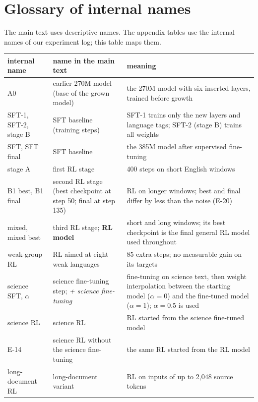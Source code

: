 
\FloatBarrier

\section{Glossary of internal names}\label{app:glossary}
The main text uses descriptive names. The appendix tables use the internal names of our experiment log; this table maps them.
\begin{table}[h]
\centering\footnotesize
\begin{tabularx}{\linewidth}{@{}>{\raggedright\arraybackslash}p{3.6cm}>{\raggedright\arraybackslash}p{3.6cm}X@{}}
\toprule
internal name & name in the main text & meaning\\
\midrule
A0 & earlier 270M model (base of the grown model) & the 270M model with six inserted layers, trained before growth\\
SFT-1, SFT-2, stage B & SFT baseline (training steps) & SFT-1 trains only the new layers and language tags; SFT-2 (stage B) trains all weights\\
SFT, SFT final & SFT baseline & the 385M model after supervised fine-tuning\\
stage A & first RL stage & 400 steps on short English windows\\
B1 best, B1 final & second RL stage (best checkpoint at step 50; final at step 135) & RL on longer windows; best and final differ by less than the noise (E-20)\\
mixed, mixed best & third RL stage; \textbf{RL model} & short and long windows; its best checkpoint is the final general RL model used throughout\\
weak-group RL & RL aimed at eight weak languages & 85 extra steps; no measurable gain on its targets\\
science SFT, $\alpha$ & science fine-tuning step; \emph{+ science fine-tuning} & fine-tuning on science text, then weight interpolation between the starting model ($\alpha=0$) and the fine-tuned model ($\alpha=1$); $\alpha=0.5$ is used\\
science RL & science RL & RL started from the science fine-tuned model\\
E-14 & science RL without the science fine-tuning & the same RL started from the RL model\\
long-document RL & long-document variant & RL on inputs of up to 2,048 source tokens\\

\end{tabularx}
\end{table}
